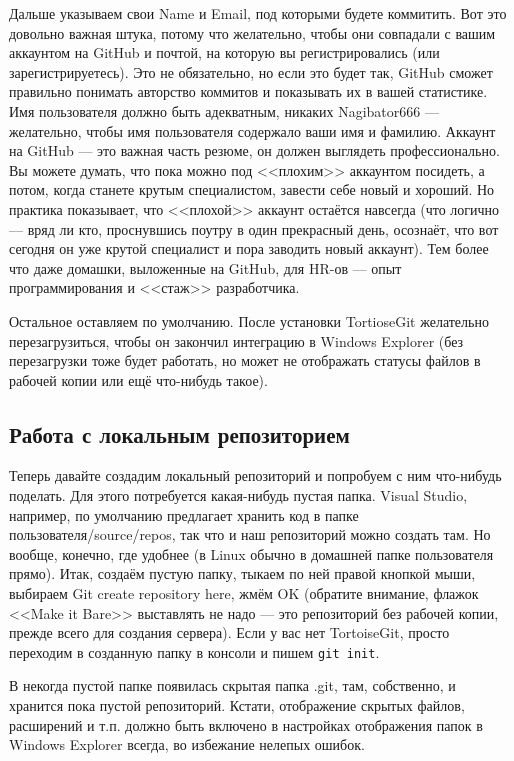 \documentclass{../../text-style}
\begin{document}
Дальше указываем свои Name и Email, под которыми будете коммитить. Вот это довольно важная штука, потому что желательно, чтобы они совпадали с вашим аккаунтом на GitHub и почтой, на которую вы регистрировались (или зарегистрируетесь). Это не обязательно, но если это будет так, GitHub сможет правильно понимать авторство коммитов и показывать их в вашей статистике. Имя пользователя должно быть адекватным, никаких Nagibator666 --- желательно, чтобы имя пользователя содержало ваши имя и фамилию. Аккаунт на GitHub --- это важная часть резюме, он должен выглядеть профессионально. Вы можете думать, что пока можно под <<плохим>> аккаунтом посидеть, а потом, когда станете крутым специалистом, завести себе новый и хороший. Но практика показывает, что <<плохой>> аккаунт остаётся навсегда (что логично --- вряд ли кто, проснувшись поутру в один прекрасный день, осознаёт, что вот сегодня он уже крутой специалист и пора заводить новый аккаунт). Тем более что даже домашки, выложенные на GitHub, для HR-ов --- опыт программирования и <<стаж>> разработчика.

Остальное оставляем по умолчанию. После установки TortioseGit желательно перезагрузиться, чтобы он закончил интеграцию в Windows Explorer (без перезагрузки тоже будет работать, но может не отображать статусы файлов в рабочей копии или ещё что-нибудь такое).

\subsection{Работа с локальным репозиторием}

Теперь давайте создадим локальный репозиторий и попробуем с ним что-нибудь поделать. Для этого потребуется какая-нибудь пустая папка. Visual Studio, например, по умолчанию предлагает хранить код в папке пользователя/source/repos, так что и наш репозиторий можно создать там. Но вообще, конечно, где удобнее (в Linux обычно в домашней папке пользователя прямо). Итак, создаём пустую папку, тыкаем по ней правой кнопкой мыши, выбираем Git create repository here, жмём OK (обратите внимание, флажок <<Make it Bare>> выставлять не надо --- это репозиторий без рабочей копии, прежде всего для создания сервера). Если у вас нет TortoiseGit, просто переходим в созданную папку в консоли и пишем \verb|git init|.

В некогда пустой папке появилась скрытая папка .git, там, собственно, и хранится пока пустой репозиторий. Кстати, отображение скрытых файлов, расширений и т.п. должно быть включено в настройках отображения папок в Windows Explorer всегда, во избежание нелепых ошибок.
\end{document}
